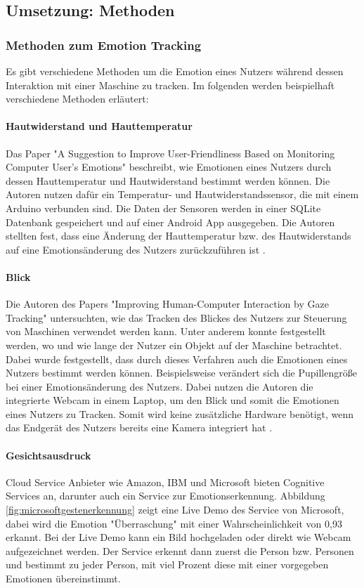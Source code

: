 \subsection{Umsetzung: Methoden}
\subsubsection{Methoden zum Emotion Tracking}\label{MethodenEmotionTracking}
Es gibt verschiedene Methoden um die Emotion eines Nutzers während dessen Interaktion mit einer Maschine zu tracken. Im folgenden werden beispielhaft verschiedene Methoden erläutert:


\paragraph {Hautwiderstand und Hauttemperatur}
Das Paper "A Suggestion to Improve User-Friendliness Based
on Monitoring Computer User’s Emotions" beschreibt, wie Emotionen eines Nutzers durch dessen Hauttemperatur und Hautwiderstand bestimmt werden können. Die Autoren nutzen dafür ein Temperatur- und Hautwiderstandssensor, die mit einem Arduino verbunden sind. Die Daten der Sensoren werden in einer SQLite Datenbank gespeichert und auf einer Android App ausgegeben. Die Autoren stellten fest, dass eine Änderung der Hauttemperatur bzw. des Hautwiderstands  auf eine Emotionsänderung des Nutzers zurückzuführen ist \cite{EmotionTrackingGSR}.

\paragraph{Blick}
Die Autoren des Papers "Improving Human-Computer Interaction
by Gaze Tracking" untersuchten, wie das Tracken des Blickes des Nutzers zur Steuerung von Maschinen verwendet werden kann. Unter anderem konnte festgestellt werden, wo und wie lange der Nutzer ein Objekt auf der Maschine betrachtet. Dabei wurde festgestellt, dass durch dieses Verfahren auch die Emotionen eines Nutzers bestimmt werden können. Beispielsweise verändert sich die Pupillengröße bei einer Emotionsänderung des Nutzers. Dabei nutzen die Autoren die integrierte Webcam in einem Laptop, um den Blick und somit die Emotionen eines Nutzers zu Tracken. Somit wird keine zusätzliche Hardware benötigt, wenn das Endgerät des Nutzers bereits eine Kamera integriert hat \cite{EmotionTrackingGaze}.

\paragraph{Gesichtsausdruck}
Cloud Service Anbieter wie Amazon, IBM und Microsoft bieten Cognitive Services an, darunter auch ein Service zur Emotionserkennung. Abbildung \ref{fig:microsoftgestenerkennung} zeigt eine Live Demo des Service von Microsoft, dabei wird die Emotion "Überraschung" mit einer Wahrscheinlichkeit von 0,93 erkannt. Bei der Live Demo kann ein Bild hochgeladen oder direkt wie Webcam aufgezeichnet werden. Der Service erkennt dann zuerst die Person bzw. Personen und bestimmt zu jeder Person, mit viel Prozent diese mit einer vorgegeben Emotionen übereinstimmt.

